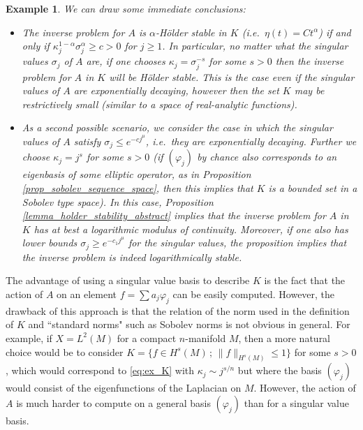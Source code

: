 \documentclass[12pt,twoside]{amsart}
\numberwithin{equation}{section}
\renewcommand{\leq}{\leqslant}
\renewcommand{\geq}{\geqslant}
\newtheorem{example}[theorem]{Example}
\newcommand{\norm}[1]{\lVert #1 \rVert}         %
\begin{document}
\begin{appendix}
\begin{example} \label{example_holder_abstract}
We can draw some immediate conclusions:
\begin{itemize}
\item 
The inverse problem for $A$ is $\alpha$-H\"older stable in $K$ (i.e.\ $\eta(t) = C t^{\alpha}$) if and only if $\kappa_j^{1-\alpha} \sigma_j^{\alpha} \geq c > 0$ for $j \geq 1$. In particular, no matter what the singular values $\sigma_j$ of $A$ are, if one chooses $\kappa_j = \sigma_j^{-s}$ for some $s > 0$ then the inverse problem for $A$ in $K$ will be H\"older stable. This is the case even if the singular values of $A$ are exponentially decaying, however then the set $K$ may be restrictively small (similar to a space of real-analytic functions). 
\item 
As a second possible scenario, we consider the case in which the singular values of $A$ satisfy $\sigma_j \leq e^{-cj^{\mu}}$, i.e.\ they are exponentially decaying. Further we choose \emph{$\kappa_j = j^{s}$} for some $s > 0$ (if $(\varphi_j)$ by chance also corresponds to an eigenbasis of some elliptic operator, as in Proposition \ref{prop_sobolev_sequence_space}, then this implies that $K$ is a bounded set in a Sobolev type space). In this case, Proposition \ref{lemma_holder_stability_abstract} implies that the inverse problem for $A$ in $K$ has at best a logarithmic modulus of continuity. Moreover, if one also has lower bounds $\sigma_j \geq e^{-c_1 j^{\mu}}$ for the singular values, the proposition implies that the inverse problem is indeed logarithmically stable.
\end{itemize}
\end{example}


The advantage of using a singular value basis to describe $K$ is the fact that the action of $A$ on an element $f = \sum a_j \varphi_j$ can be easily computed. However, the drawback of this approach is that the relation of the norm used in the definition of $K$ and ``standard norms" such as Sobolev norms is not obvious in general. For example, if $X=L^2(M)$ for a compact $n$-manifold $M$, then a more natural choice would be to consider $K = \{ f \in H^s(M) \,;\, \norm{f}_{H^s(M)} \leq 1 \}$ for some $s > 0$, which would correspond to \eqref{eq:ex_K} with $\kappa_j \sim j^{s/n}$ but where the basis $(\varphi_j)$ would consist of the eigenfunctions of the Laplacian on $M$. However, the action of $A$ is much harder to compute on a general basis $(\varphi_j)$ than for a singular value basis.


\end{appendix}
\end{document}
